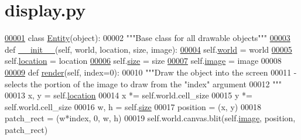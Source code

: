 \hypertarget{display_8py_source}{\section{display.\+py}
}

\begin{DoxyCode}
\hypertarget{display_8py_source_l00001}{}\hyperlink{namespacedisplay}{00001} \textcolor{keyword}{class }\hyperlink{classdisplay_1_1Entity}{Entity}(object):
00002     \textcolor{stringliteral}{"""Base class for all drawable objects"""}
\hypertarget{display_8py_source_l00003}{}\hyperlink{classdisplay_1_1Entity_a10294b5b8a8fa95f95f29aaf521efd56}{00003}     \textcolor{keyword}{def }\hyperlink{classdisplay_1_1Entity_a10294b5b8a8fa95f95f29aaf521efd56}{\_\_init\_\_}(self, world, location, size, image):
\hypertarget{display_8py_source_l00004}{}\hyperlink{classdisplay_1_1Entity_ad7e3284bfb984c309b35d5a077bd5b21}{00004}         self.\hyperlink{classdisplay_1_1Entity_ad7e3284bfb984c309b35d5a077bd5b21}{world} = world
\hypertarget{display_8py_source_l00005}{}\hyperlink{classdisplay_1_1Entity_ae2a1114b0c54ef7eb43c2bd6cd097258}{00005}         self.\hyperlink{classdisplay_1_1Entity_ae2a1114b0c54ef7eb43c2bd6cd097258}{location} = location
\hypertarget{display_8py_source_l00006}{}\hyperlink{classdisplay_1_1Entity_aa56fd9b8bb6c9510f24ea13be8c6a218}{00006}         self.\hyperlink{classdisplay_1_1Entity_aa56fd9b8bb6c9510f24ea13be8c6a218}{size} = size
\hypertarget{display_8py_source_l00007}{}\hyperlink{classdisplay_1_1Entity_a244569c285ad924e6200d4c1c8b4639c}{00007}         self.\hyperlink{classdisplay_1_1Entity_a244569c285ad924e6200d4c1c8b4639c}{image} = image
00008 
\hypertarget{display_8py_source_l00009}{}\hyperlink{classdisplay_1_1Entity_abbea5f77f08ce3347010d9c452440737}{00009}     \textcolor{keyword}{def }\hyperlink{classdisplay_1_1Entity_abbea5f77f08ce3347010d9c452440737}{render}(self, index=0):
00010         \textcolor{stringliteral}{"""Draw the object into the screen}
00011 \textcolor{stringliteral}{            - selects the portion of the image to draw from the "index" argument}
00012 \textcolor{stringliteral}{        """}
00013         x, y = self.\hyperlink{classdisplay_1_1Entity_ae2a1114b0c54ef7eb43c2bd6cd097258}{location}
00014         x *= self.world.cell\_size
00015         y *= self.world.cell\_size
00016         w, h = self.\hyperlink{classdisplay_1_1Entity_aa56fd9b8bb6c9510f24ea13be8c6a218}{size}
00017         position = (x, y)
00018         patch\_rect = (w*index, 0, w, h)
00019         self.world.canvas.blit(self.\hyperlink{classdisplay_1_1Entity_a244569c285ad924e6200d4c1c8b4639c}{image}, position, patch\_rect)
\end{DoxyCode}
